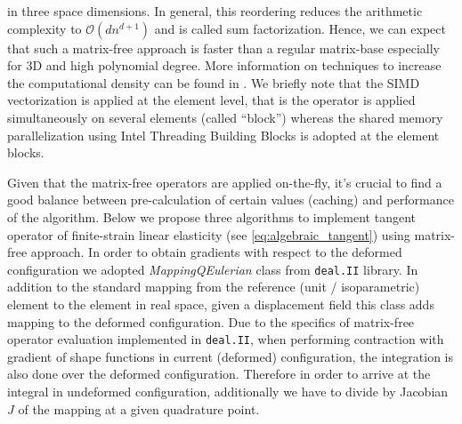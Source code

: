 \documentclass[preprint,12pt,times]{elsarticle}
\begin{document}
in three space dimensions. In general, this reordering reduces the arithmetic complexity to $\mathcal{O}(dn^{d+1})$ and is called sum factorization.
Hence, we can expect that such a matrix-free approach is faster than a regular matrix-base especially for 3D and high polynomial degree.
More information on techniques to increase the computational density can be found in \cite{kronbichler12,vos10}.
We briefly note that the SIMD vectorization is applied at the element level, that is the operator is applied simultaneously on several elements (called ``block'') whereas the shared memory parallelization using Intel Threading Building Blocks is adopted at the element blocks.

Given that the matrix-free operators are applied on-the-fly, it's crucial to find a good balance between pre-calculation of certain values (caching) and performance of the algorithm.
Below we propose three algorithms to implement tangent operator of finite-strain linear elasticity (see \eqref{eq:algebraic_tangent}) using matrix-free approach.
%
In order to obtain gradients with respect to the deformed configuration we adopted \textit{MappingQEulerian} class from \texttt{deal.II} library.
In addition to the standard mapping from the reference (unit / isoparametric) element to the element in real space, given a displacement field this class adds mapping to the deformed configuration.
%
Due to the specifics of matrix-free operator evaluation implemented in \texttt{deal.II}, when performing contraction with gradient of shape functions in current (deformed) configuration, the integration is also done over the deformed configuration. Therefore in order to arrive at the integral in undeformed configuration, additionally we have to divide by Jacobian $J$ of the mapping at a given quadrature point.
\end{document}
